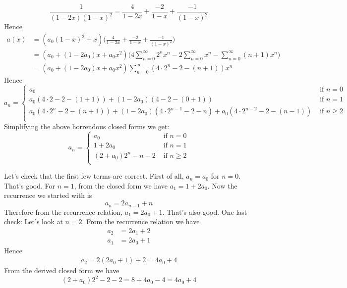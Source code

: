 \[
\frac{1}{(1-2x)(1-x)^2}
= 
\frac{4}{1-2x}
+
\frac{-2}{1-x}
+
\frac{-1}{(1-x)^2}
\]
Hence
\begin{align*}
a(x) 
&= 
(a_0(1-x)^2 + x) 
\biggl(
\frac{4}{1-2x}
+
\frac{-2}{1-x}
+
\frac{-1}{(1-x)^2}
\biggr) \\
&= 
(a_0 + (1-2a_0)x + a_0 x^2) 
\biggl(
4 \sum_{n=0}^\infty 2^n x^n
-2 \sum_{n=0}^\infty x^n
- \sum_{n=0}^\infty (n+1) x^n
\biggr) \\
&= 
(a_0 + (1-2a_0)x + a_0 x^2) 
\sum_{n=0}^\infty (4 \cdot 2^n - 2 - (n+1))x^n
\end{align*}
Hence 
\[
a_n = 
\begin{cases}
a_0 &\text{ if } n = 0 \\
%
a_0(4 \cdot 2 - 2 - (1+1)) + (1-2a_0)(4 - 2 - (0+1)) &\text{ if } n = 1 \\
%
a_0(4 \cdot 2^n - 2 - (n+1)) + (1-2a_0)(4 \cdot 2^{n-1} - 2 - n) +
a_0(4 \cdot 2^{n-2} - 2 - (n-1))
& \text{ if } n \geq 2 \\
\end{cases}
\]
Simplifying the above horrendous closed forms we get:
\[
a_n = 
\begin{cases}
a_0 &\text{ if } n = 0 \\
%
1 + 2a_0 &\text{ if } n = 1 \\
%
(2 + a_0)2^n - n  -2 & \text{ if } n \geq 2 \\
\end{cases}
\]

Let's check that the first few terms are correct.
First of all, $a_n = a_0$ for $n = 0$.
That's good.
For $n = 1$, from the closed form we have $a_1 = 1 + 2a_0$.
Now the recurrence we started with is
\[
a_n = 2a_{n-1} + n
\]
Therefore from the recurrence relation, $a_1 = 2a_0 + 1$.
That's also good.
One last check: Let's look at $n = 2$.
From the recurrence relation we have
\begin{align*}
a_2 &= 2a_1 + 2 \\
a_1 &= 2a_0 + 1
\end{align*}
Hence
\begin{align*}
a_2 = 2(2a_0 + 1) + 2 = 4a_0 + 4
\end{align*}
From the derived closed form we have
\[
(2 + a_0)2^2 - 2 - 2 = 8 + 4a_0 - 4 = 4a_0 + 4
\]






